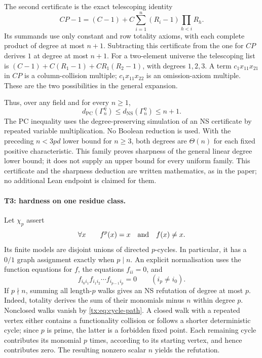 \documentclass[11pt,a4paper,oneside,openany]{book}
\theoremstyle{definition}\newtheorem{definition}[theorem]{Definition}
\theoremstyle{remark}\newtheorem{remark}[theorem]{Remark}
\newcommand{\NS}{\mathrm{NS}}\newcommand{\PC}{\mathrm{PC}}
\numberwithin{equation}{chapter}
\begin{document}
The second certificate is the exact telescoping identity
\[
 CP-1=(C-1)+C\sum_{i=1}^n(R_i-1)\prod_{h<i}R_h.
\]
Its summands use only constant and row totality axioms, with each
complete product of degree at most $n+1$. Subtracting this certificate
from the one for $CP$ derives $1$ at degree at most $n+1$.
For a two-element universe the telescoping list is
$(C-1)+C(R_1-1)+CR_1(R_2-1)$, with degrees $1,2,3$.
A term $c_1x_{11}x_{21}$ in $CP$ is a column-collision multiple;
$c_1x_{11}x_{22}$ is an omission-axiom multiple. These are the two
possibilities in the general expansion.

Thus, over any field and for every $n\ge1$,
\[
 d_{\PC}(\Gamma_n^\eta)\le d_{\NS}(\Gamma_n^\eta)\le n+1.
\]
The PC inequality uses the degree-preserving simulation of an NS
certificate by repeated variable multiplication. No Boolean reduction
is used. With the preceding $n<3pd$ lower bound for $n\ge3$, both
degrees are $\Theta(n)$ for each fixed positive characteristic.
This family proves sharpness of the general linear degree lower bound; it does
not supply an upper bound for every uniform family. This certificate
and the sharpness deduction are written mathematics, as in the paper;
no additional Lean endpoint is claimed for them.

\paragraph{T3: hardness on one residue class.}
Let $\chi_p$ assert
\[
 \forall x\qquad f^p(x)=x\quad\hbox{and}\quad f(x)\ne x.
\]
Its finite models are disjoint unions of directed $p$-cycles. In particular,
it has a $0/1$ graph assignment exactly when $p\mid n$. An explicit
normalisation uses the function equations for $f$, the equations $f_{ii}=0$,
and
\begin{equation}\label{tx:eq:cycle-path}
 f_{i_0i_1}f_{i_1i_2}\cdots f_{i_{p-1}i_p}=0
 \qquad(i_p\ne i_0).
\end{equation}
If $p\nmid n$, summing all length-$p$ walks gives an NS refutation of degree
at most $p$. Indeed, totality derives the sum of their monomials minus $n$
within degree $p$. Nonclosed walks vanish by \eqref{tx:eq:cycle-path}.
A closed walk with a repeated vertex either contains a functionality
collision or follows a shorter deterministic cycle; since $p$ is prime,
the latter is a forbidden fixed point. Each remaining cycle contributes its
monomial $p$ times, according to its starting vertex, and hence contributes
zero. The resulting nonzero scalar $n$ yields the refutation.
\end{document}
